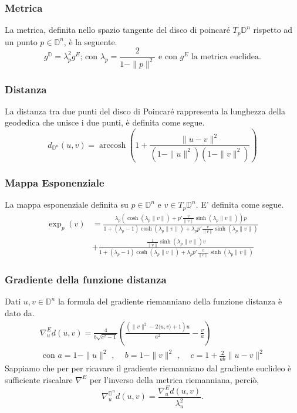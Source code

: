 \documentclass[a4paper, 12pt]{article}
\DeclareMathOperator\arccosh{arccosh}
\begin{document}
\subsubsection{Metrica}
La metrica, definita nello spazio tangente del disco di poincaré $T_p\mathbb{D}^n$ rispetto ad un punto $p \in \mathbb{D}^n$, è la seguente.\\
\[g^\mathbb{D} = \lambda_p^2 g^E \mbox{; con } \lambda_p = \frac{2}{1- \parallel p \parallel^2} \mbox{ e con } g^E \mbox{ la metrica euclidea}.\]
\subsubsection{Distanza}
La distanza tra due punti del disco di Poincaré rappresenta la lunghezza della geodedica che unisce i due punti, è definita come segue.\\
\[d_{\mathbb{D}^n}(u, v) = \arccosh \left(1 + \frac{\| u - v\|^2}{(1-\| u \|^2)(1-\| v \|^2)} \right)\]
\subsubsection{Mappa Esponenziale}
La mappa esponenziale definita su $p \in \mathbb{D}^n$ e $v \in T_p\mathbb{D}^n$. E' definita come segue.\\
\begin{equation*}\begin{split}
\exp_p(v) &= \frac{\lambda_p (\cosh(\lambda_p \| v \|) + p'\frac{v}{\| v \|} \sinh(\lambda_p \| v \|))p}{1 + (\lambda_p - 1) \cosh(\lambda_p \| v \|) + \lambda_p p ' \frac{v}{\| v \|} \sinh(\lambda_p \| v \|)} \\
&+ \frac{\frac{1}{\| v \|} \sinh(\lambda_p \| v \|) v}{1 + (\lambda_p - 1) \cosh(\lambda_p \| v \|) + \lambda_p p' \frac{v}{\| v \|} \sinh(\lambda_p \| v \|)}
\end{split}\end{equation*}
\subsubsection{Gradiente della funzione distanza}
Dati $u,v \in \mathbb{D}^n$ la formula del gradiente riemanniano della funzione distanza è dato da.\\
\begin{equation*}\begin{gathered}
\nabla_u^{E} d(u,v) = \frac{4}{b \sqrt{c^2 - 1}} \left(\frac{(\| v \|^2 - 2\langle u,v \rangle + 1)u}{a^2} - \frac{v}{a}\right) \\ \mbox{ con } a = 1 - \| u \|^2 \mbox{ , } \quad b = 1 - \| v \|^2 \mbox{ , } \quad c = 1 + \frac{2}{ab} \| u - v \|^2
\end{gathered}\end{equation*}
Sappiamo che per per ricavare il gradiente riemanniano dal gradiente euclideo è sufficiente riscalare $\nabla^E$ per l'inverso della metrica riemanniana, perciò,\\ \[\nabla_u^{\mathbb{D}^n} d(u,v) = \frac{\nabla_u^{E} d(u,v)}{\lambda_u^2}.\]
\end{document}
